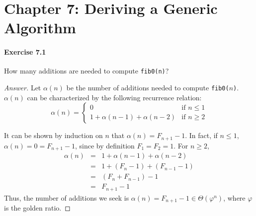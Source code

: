 \section*{Chapter 7: Deriving a Generic Algorithm}

\paragraph{Exercise 7.1}
How many additions are needed to compute \texttt{fib0(n)}?

\begin{proof}[Answer]
Let $\alpha(n)$ be the number of additions needed to compute
\texttt{fib0(}$n$\texttt{)}. $\alpha(n)$ can be characterized by
the following recurrence relation:
$$
\alpha(n) = 
\begin{cases}
    0 & \textrm{if } n \leq 1 \\
    1 + \alpha(n-1) + \alpha(n-2) & \textrm{if } n \geq 2
\end{cases}
$$

It can be shown by induction on $n$ that $\alpha(n) = F_{n+1} - 1$.
In fact, if $n \leq 1$, $\alpha(n) = 0 = F_{n+1} - 1$, since
by definition $F_1 = F_2 = 1$. For $n \geq 2$,
\begin{eqnarray*}
\alpha(n)  &=& 1 + \alpha(n-1) + \alpha(n-2) \\
           &=& 1 + (F_n - 1) + (F_{n-1} - 1) \\
           &=& (F_n + F_{n-1}) - 1 \\
           &=& F_{n+1} - 1
\end{eqnarray*}
Thus, the number of additions we seek is
$\alpha(n) = F_{n+1} -1 \in \Theta(\varphi^n)$, where $\varphi$ is the 
golden ratio.
\end{proof}

